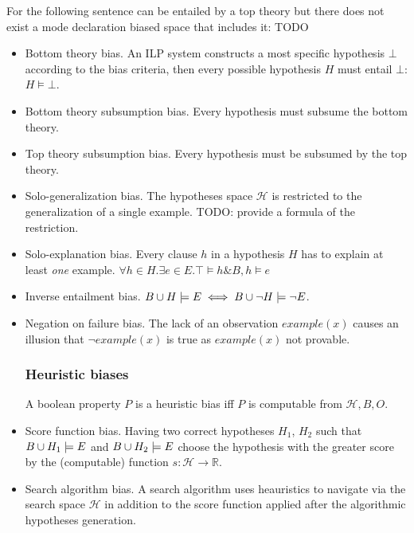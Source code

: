 \begin{exmp}
For the following sentence can be entailed by a top theory but there does not exist a mode declaration biased space that includes it:
TODO
\end{exmp}

\begin{itemize}
\item Bottom theory bias. An ILP system constructs a most specific hypothesis $\bot$ according to the bias criteria, then every possible hypothesis $H$ must entail $\bot$: $H \models \bot$.
\item Bottom theory subsumption bias. Every hypothesis must subsume the bottom theory.
\item Top theory subsumption bias. Every hypothesis must be subsumed by the top theory.
\item Solo-generalization bias. The hypotheses space $\mathcal{H}$ is restricted to the generalization of a single example. \cite{muggleton2012mc}
TODO: provide a formula of the restriction.
\item Solo-explanation bias. Every clause $h$ in a hypothesis $H$ has to explain at least \emph{one} example.
$\forall h \in H. \exists e \in E. \top \models h \& B, h \models e$
\item Inverse entailment bias.
$B \cup H \models E \iff B \cup \neg H \models \neg E$.
\item Negation on failure bias. The lack of an observation $example(x)$
causes an illusion that $\neg example(x)$ is true as $example(x)$ not provable.

\subsubsection{Heuristic biases}
\begin{defn}
A boolean property $P$ is a heuristic bias iff $P$ is computable from $\mathcal{H}, B, O$.
\end{defn}
\item Score function bias. Having two correct hypotheses $H_1$, $H_2$ such that $B \cup H_1 \models E$ and $B \cup H_2 \models E$ choose the hypothesis with the greater score by the (computable) function $s:\mathcal{H} \to \mathbb{R}$.
\item Search algorithm bias. A search algorithm uses heauristics to navigate via the search space $\mathcal{H}$ in addition to the score function applied after the algorithmic hypotheses generation.
\end{itemize}

